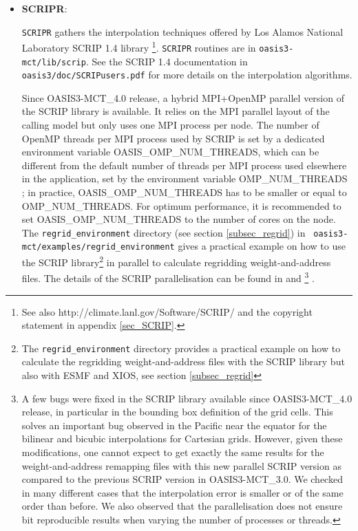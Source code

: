 \begin{itemize}
\begin{itemize}
  \end{itemize}

  Note that if {\tt SCRIPR} (see below) is used to calculate the
  remapping file, {\tt MAPPING} can still be listed in the {\tt
    namcouple}, for example to use it with a specific {\tt
    \$MAPLOC} or {\tt \$MAPSTRATEGY} option.

\item {\bf SCRIPR}:
 
  {\tt SCRIPR} gathers the interpolation techniques offered by Los
  Alamos National Laboratory SCRIP 1.4 library
  \citep{Jones99}\footnote{See also
    http://climate.lanl.gov/Software/SCRIP/ and the copyright
    statement in appendix \ref{sec_SCRIP}.}.  {\tt SCRIPR} routines
  are in {\tt oasis3-mct/lib/scrip}. See the SCRIP 1.4 documentation
  in {\tt oasis3/doc/SCRIPusers.pdf} for more details on the
  interpolation algorithms.
  
 Since OASIS3-MCT\_4.0 release, a hybrid MPI+OpenMP parallel version
 of the SCRIP library is available. It relies on the MPI parallel
 layout of the calling model but only uses one MPI process per
 node. The number of OpenMP threads per MPI process used by SCRIP is
 set by a dedicated environment variable OASIS\_OMP\_NUM\_THREADS,
 which can be different from the default number of threads per MPI
 process used elsewhere in the application, set by the environment
 variable OMP\_NUM\_THREADS ; in practice, OASIS\_OMP\_NUM\_THREADS has
 to be smaller or equal to OMP\_NUM\_THREADS. For optimum performance,
 it is recommended to set OASIS\_OMP\_NUM\_THREADS to the number of
 cores on the node. The {\tt regrid\_environment} directory (see
 section \ref{subsec_regrid}) in {\tt
 oasis3-mct/examples/regrid\_environment} gives a practical example on
how to use the SCRIP library\footnote{The {\tt regrid\_environment}
  directory provides a practical example on how to calculate the
  regridding weight-and-address files with the SCRIP library but also
  with ESMF and XIOS, see section \ref{subsec_regrid}}  in parallel to
calculate regridding weight-and-address files. The details of the
SCRIP parallelisation can be found in \cite{piacentini08} and
\cite{valcke11}\footnote{A few bugs
  were fixed in the SCRIP library available since OASIS3-MCT\_4.0 release, in particular in the bounding box definition of the grid cells. This solves an important bug observed in the Pacific near the equator for the bilinear and bicubic interpolations for Cartesian grids. However, given these modifications, one cannot expect to get exactly the same results for the weight-and-address remapping files with this new parallel SCRIP version as compared to the previous SCRIP version in OASIS3-MCT\_3.0. We checked in many different cases that the interpolation error is smaller or of the same order than before. We also observed that the parallelisation does not ensure bit reproducible results when varying the number of processes or threads.} .


\end{itemize}

